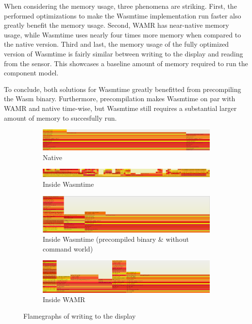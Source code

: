 When considering the memory usage, three phenomena are striking. First, the performed optimizations to make the Wasmtime implementation run faster also greatly benefit the memory usage. Second, WAMR has near-native memory usage, while Wasmtime uses nearly four times more memory when compared to the native version. Third and last, the memory usage of the fully optimized version of Wasmtime is fairly similar between writing to the display and reading from the sensor. This showcases a baseline amount of memory required to run the component model.

To conclude, both solutions for Wasmtime greatly benefitted from precompiling the Wasm binary. Furthermore, precompilation makes Wasmtime on par with WAMR and native time-wise, but Wasmtime still requires a substantial larger amount of memory to succesfully run.

\begin{figure}
  \begin{subfigure}{\linewidth}
    \centering
    \includegraphics[width=\textwidth]{figures/native_led_flamegraph}
    \caption{Native}
    \label{fig:flamegraph:led:native}
  \end{subfigure}
  \begin{subfigure}{\linewidth}
    \centering
    \includegraphics[width=\textwidth]{figures/wasmtime_flamegraph}
    \caption{Inside Wasmtime}
    \label{fig:flamegraph:wasmtime}
  \end{subfigure}
  \begin{subfigure}{\linewidth}
    \centering
    \includegraphics[width=\textwidth]{figures/optim_led_flamegraph}
    \caption{Inside Wasmtime (precompiled binary \& without command world)}
    \label{fig:flamegraph:led:compiled}
  \end{subfigure}
  \begin{subfigure}{\linewidth}
    \centering
    \includegraphics[width=\textwidth]{figures/wamr_led_flamegraph}
    \caption{Inside WAMR}
    \label{fig:flamegraph:led:wamr}
  \end{subfigure}
  \caption{Flamegraphs of writing to the display}
\end{figure}

